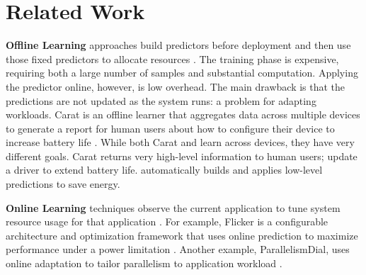 \section{Related Work}



\noindent \textbf{Offline Learning} approaches build predictors before
deployment and then use those fixed predictors to allocate resources
\cite{Yi2003,LeeBrooks2006,CPR,ChenJohn2011,petabricksStatic}.  The
training phase is expensive, requiring both a large number of samples
and substantial computation.  Applying the predictor online, however,
is low overhead.  The main drawback is that the predictions are not
updated as the system runs: a problem for adapting workloads.    Carat is an offline learner
that aggregates data across multiple devices to generate a report for
human users about how to configure their device to increase battery
life \cite{carat}.  While both Carat and \SYSTEM{} learn across
devices, they have very different goals.  Carat returns very
high-level information to human users; \eg{} update a driver to extend
battery life.  \SYSTEM{} automatically builds and applies low-level
predictions to save energy.

\noindent \textbf{Online Learning} techniques observe the current
application to tune system resource usage for that application
\cite{Li2006,Flicker,ParallelismDial,Ponamarev,petabricksDynamic,LeeBrooks}.
For example, Flicker is a configurable architecture and optimization
framework that uses online prediction to maximize performance under a
power limitation \cite{Flicker}.  Another example, ParallelismDial,
uses online adaptation to tailor parallelism to application workload
\cite{ParallelismDial}.



